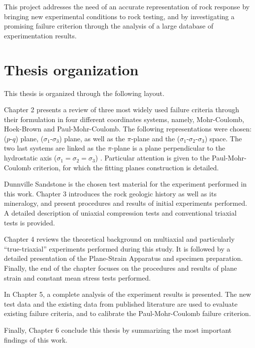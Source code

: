 This project addresses the need of an accurate representation of rock response by bringing new experimental conditions to rock testing, and by investigating a promising failure criterion through the analysis of a large database of experimentation results. 

\section{Thesis organization}

This thesis is organized through the following layout. 

Chapter 2 presents a review of three most widely used failure criteria through their formulation in four different coordinates systems, namely, Mohr-Coulomb, Hoek-Brown and Paul-Mohr-Coulomb. The following representations were chosen:  ($p$-$q$) plane, ($\sigma_1$-$\sigma_3$) plane, as well as the $\pi$-plane and the ($\sigma_1$-$\sigma_2$-$\sigma_3$) space. The two last systems are linked as the $\pi$-plane is a plane perpendicular to the hydrostatic axis ($\sigma_1=\sigma_2=\sigma_3$) . Particular attention is given to the Paul-Mohr-Coulomb criterion, for which the fitting planes construction is detailed. 

Dunnville Sandstone is the chosen test material for the experiment performed in this work. Chapter 3 introduces the rock geologic history as well as its mineralogy, and present procedures and results of initial experiments performed. A detailed description of uniaxial compression tests and conventional triaxial tests is provided. 

Chapter 4 reviews the theoretical background on multiaxial and particularly “true-triaxial” experiments performed during this study. It is followed by a detailed presentation of the Plane-Strain Apparatus and specimen preparation. Finally, the end of the chapter focuses on the procedures and results of plane strain and constant mean stress tests performed. 

In Chapter 5, a complete analysis of the experiment results is presented. The new test data and the existing data from published literature are used to evaluate existing failure criteria, and to calibrate the Paul-Mohr-Coulomb failure criterion.

Finally, Chapter 6 conclude this thesis by summarizing the most important findings of this work.
